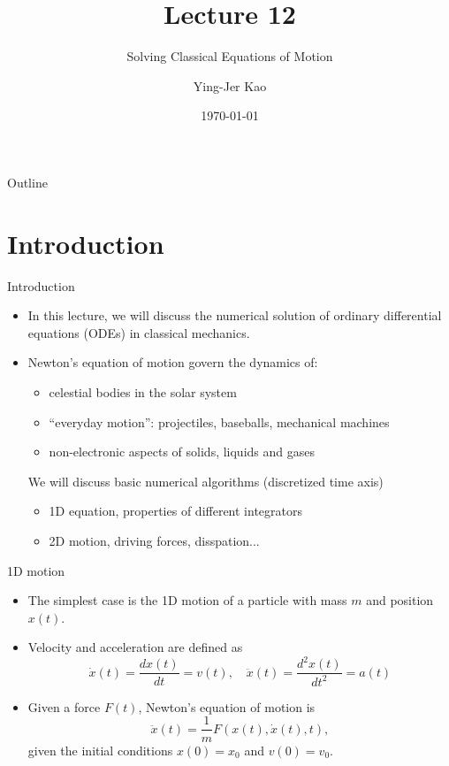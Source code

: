 \documentclass{beamer}
\title[Solving Classical Equations of Motion] %
{Lecture 12}
\subtitle
{Solving Classical Equations of Motion} %
\author[Ying-Jer Kao] %
{Ying-Jer Kao}
\institute[National Taiwan University] %
{
  Department of Physics\\
 National Taiwan University
  }
\date[Numerical Analysis and Programming] %
{\today}
\begin{document}
\begin{frame}
  \titlepage
\end{frame}

\begin{frame}{Outline}
  \tableofcontents
\end{frame}



\section[Introduction]{Introduction}
\begin{frame}{Introduction}
\begin{itemize}
\item In this lecture, we will discuss the numerical solution of 
ordinary differential equations (ODEs) in classical mechanics.
\item Newton's equation of motion govern the dynamics of:
\begin{itemize}
\item \alert{celestial bodies} in the solar system
\item ``everyday motion'': projectiles, baseballs, mechanical machines
\item  non-electronic aspects of solids, liquids and gases
\end{itemize} 
We will discuss basic numerical algorithms (discretized time axis)
\begin{itemize}
\item 1D equation, properties of different integrators
\item 2D motion, driving forces, disspation...
\end{itemize}
\end{itemize}
\end{frame}

\begin{frame}{1D motion}
\begin{itemize}
\item The simplest case is the 1D motion of a particle with mass $m$ and position $x(t)$.
\item Velocity and acceleration are defined as
\[
\dot{x}(t)=\frac{d x(t)}{d t}=v(t), \quad \ddot{x}(t)=\frac{d^2 x(t)}{d t^2}=a(t)
\]
\item Given a force $F(t)$, Newton's equation of motion is
\[ 
\ddot{x}(t)=\frac{1}{m} F(x(t), \dot{x}(t),t), 
\]
given the initial conditions $x(0)=x_0$ and $v(0)=v_0$.
\end{itemize}
\end{frame}
\end{document}
